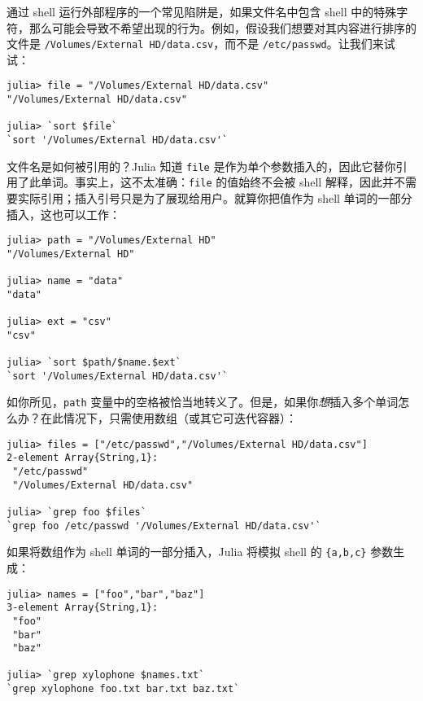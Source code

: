 通过 shell 运行外部程序的一个常见陷阱是，如果文件名中包含 shell 中的特殊字符，那么可能会导致不希望出现的行为。例如，假设我们想要对其内容进行排序的文件是 \texttt{/Volumes/External HD/data.csv}，而不是 \texttt{/etc/passwd}。让我们来试试：




\begin{verbatim}
julia> file = "/Volumes/External HD/data.csv"
"/Volumes/External HD/data.csv"

julia> `sort $file`
`sort '/Volumes/External HD/data.csv'`
\end{verbatim}



文件名是如何被引用的？Julia 知道 \texttt{file} 是作为单个参数插入的，因此它替你引用了此单词。事实上，这不太准确：\texttt{file} 的值始终不会被 shell 解释，因此并不需要实际引用；插入引号只是为了展现给用户。就算你把值作为 shell 单词的一部分插入，这也可以工作：




\begin{verbatim}
julia> path = "/Volumes/External HD"
"/Volumes/External HD"

julia> name = "data"
"data"

julia> ext = "csv"
"csv"

julia> `sort $path/$name.$ext`
`sort '/Volumes/External HD/data.csv'`
\end{verbatim}



如你所见，\texttt{path} 变量中的空格被恰当地转义了。但是，如果你\emph{想}插入多个单词怎么办？在此情况下，只需使用数组（或其它可迭代容器）：




\begin{verbatim}
julia> files = ["/etc/passwd","/Volumes/External HD/data.csv"]
2-element Array{String,1}:
 "/etc/passwd"
 "/Volumes/External HD/data.csv"

julia> `grep foo $files`
`grep foo /etc/passwd '/Volumes/External HD/data.csv'`
\end{verbatim}



如果将数组作为 shell 单词的一部分插入，Julia 将模拟 shell 的 \texttt{\{a,b,c\}} 参数生成：




\begin{verbatim}
julia> names = ["foo","bar","baz"]
3-element Array{String,1}:
 "foo"
 "bar"
 "baz"

julia> `grep xylophone $names.txt`
`grep xylophone foo.txt bar.txt baz.txt`
\end{verbatim}



